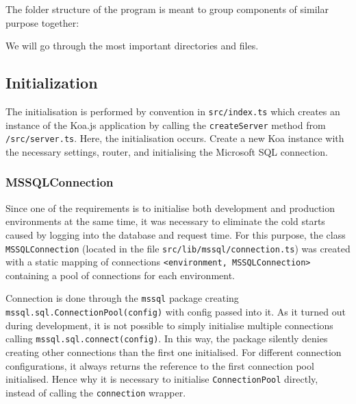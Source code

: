 The folder structure of the program is meant to group components of similar purpose together:

We will go through the most important directories and files.

\subsection{Initialization}
The initialisation is performed by convention in \texttt{src/index.ts} which creates an instance of the Koa.js application by calling the \texttt{createServer} method from \texttt{/src/server.ts}.
Here, the initialisation occurs. 
Create a new Koa instance with the necessary settings, router, and initialising the Microsoft SQL connection.

\subsubsection{MSSQLConnection}
Since one of the requirements is to initialise both development and production environments at the same time, it was necessary to eliminate the cold starts caused by logging into the database and request time. 
For this purpose, the class \texttt{MSSQLConnection} (located in the file \texttt{src/lib/mssql/connection.ts}) was created with a static mapping of connections \texttt{<environment, MSSQLConnection>} containing a pool of connections for each environment.

Connection is done through the \texttt{mssql} package creating \\ \texttt{mssql.sql.ConnectionPool(config)} with config passed into it.
As it turned out during development, it is not possible to simply initialise multiple connections calling \texttt{mssql.sql.connect(config)}.
In this way, the package silently denies creating other connections than the first one initialised.
For different connection configurations, it always returns the reference to the first connection pool initialised.
Hence why it is necessary to initialise \texttt{ConnectionPool} directly, instead of calling the \texttt{connection} wrapper.

